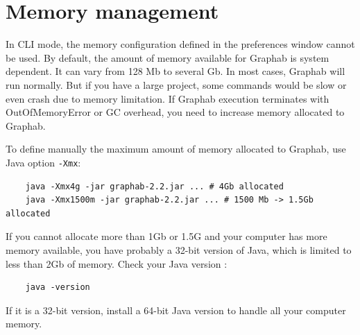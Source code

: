 \documentclass[a4paper,10pt]{report}
\begin{document}
\section{Memory management}
In CLI mode, the memory configuration defined in the preferences window cannot be used.
By default, the amount of memory available for Graphab is system dependent. It can vary from 128 Mb to several Gb.
In most cases, Graphab will run normally. But if you have a large project, some commands would be slow or even crash due to memory limitation.
If Graphab execution terminates with OutOfMemoryError or GC overhead, you need to increase memory allocated to Graphab.

To define manually the maximum amount of memory allocated to Graphab, use Java option \verb|-Xmx|:
\begin{Verbatim}
	java -Xmx4g -jar graphab-2.2.jar ... # 4Gb allocated
	java -Xmx1500m -jar graphab-2.2.jar ... # 1500 Mb -> 1.5Gb allocated
\end{Verbatim}
If you cannot allocate more than 1Gb or 1.5G and your computer has more memory available, you have probably a
 32-bit version of Java, which is limited to less than 2Gb of memory.
Check your Java version :
\begin{Verbatim}
	java -version
\end{Verbatim}
If it is a 32-bit version, install a 64-bit Java version to handle all your computer memory.



\end{document}
